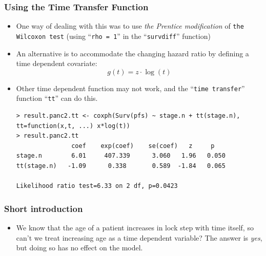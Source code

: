 \documentclass{beamer}
\newcommand{\empr}[1]{{\emph{\color{red}#1}}}
\begin{document}
\pagebreak
\begin{frame}[fragile]
\frametitle{Using the Time Transfer Function}
\begin{itemize}
\item One way of dealing with this was to use \empr{the Prentice modification} of \texttt{the Wilcoxon test} (using ``\texttt{rho = 1}'' in the ``\texttt{survdiff}'' function)
\item An alternative is to accommodate the changing hazard ratio by defining a time dependent covariate:
\begin{equation}
g(t) = z\cdot \log(t)
\end{equation}
\item Other time dependent function may not work, and the ``\texttt{time transfer}'' function ``\texttt{tt}'' can do this.
\begin{Verbatim}
> result.panc2.tt <- coxph(Surv(pfs) ~ stage.n + tt(stage.n),
tt=function(x,t, ...) x*log(t))
> result.panc2.tt
               coef    exp(coef)    se(coef)   z     p 
stage.n        6.01     407.339      3.060   1.96   0.050
tt(stage.n)   -1.09      0.338       0.589  -1.84   0.065

Likelihood ratio test=6.33 on 2 df, p=0.0423
\end{Verbatim}
\end{itemize}
\end{frame}

\pagebreak
\begin{frame}
\frametitle{Short introduction}
\begin{itemize}
\item We know that the age of a patient increases in lock step with time itself, so can't we treat increasing age as a time dependent variable? The answer is \empr{yes}, but doing so has no effect on the model.
\end{itemize}
\end{frame}
\end{document}
